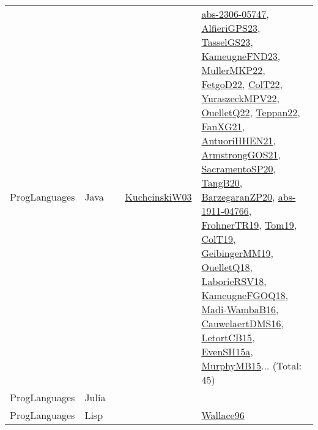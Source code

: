 {\begin{longtable}{lp{3cm}>{\raggedright}p{6cm}>{\raggedright}p{6cm}p{8cm}}
ProgLanguages & Java &  & \href{articles/KuchcinskiW03.pdf}{KuchcinskiW03}\cite{KuchcinskiW03} & \href{articles/abs-2306-05747.pdf}{abs-2306-05747}\cite{abs-2306-05747}, \href{articles/AlfieriGPS23.pdf}{AlfieriGPS23}\cite{AlfieriGPS23}, \href{papers/TasselGS23.pdf}{TasselGS23}\cite{TasselGS23}, \href{papers/KameugneFND23.pdf}{KameugneFND23}\cite{KameugneFND23}, \href{articles/MullerMKP22.pdf}{MullerMKP22}\cite{MullerMKP22}, \href{articles/FetgoD22.pdf}{FetgoD22}\cite{FetgoD22}, \href{articles/ColT22.pdf}{ColT22}\cite{ColT22}, \href{articles/YuraszeckMPV22.pdf}{YuraszeckMPV22}\cite{YuraszeckMPV22}, \href{papers/OuelletQ22.pdf}{OuelletQ22}\cite{OuelletQ22}, \href{papers/Teppan22.pdf}{Teppan22}\cite{Teppan22}, \href{articles/FanXG21.pdf}{FanXG21}\cite{FanXG21}, \href{papers/AntuoriHHEN21.pdf}{AntuoriHHEN21}\cite{AntuoriHHEN21}, \href{papers/ArmstrongGOS21.pdf}{ArmstrongGOS21}\cite{ArmstrongGOS21}, \href{articles/SacramentoSP20.pdf}{SacramentoSP20}\cite{SacramentoSP20}, \href{papers/TangB20.pdf}{TangB20}\cite{TangB20}, \href{papers/BarzegaranZP20.pdf}{BarzegaranZP20}\cite{BarzegaranZP20}, \href{articles/abs-1911-04766.pdf}{abs-1911-04766}\cite{abs-1911-04766}, \href{papers/FrohnerTR19.pdf}{FrohnerTR19}\cite{FrohnerTR19}, \href{papers/Tom19.pdf}{Tom19}\cite{Tom19}, \href{papers/ColT19.pdf}{ColT19}\cite{ColT19}, \href{papers/GeibingerMM19.pdf}{GeibingerMM19}\cite{GeibingerMM19}, \href{papers/OuelletQ18.pdf}{OuelletQ18}\cite{OuelletQ18}, \href{articles/LaborieRSV18.pdf}{LaborieRSV18}\cite{LaborieRSV18}, \href{papers/KameugneFGOQ18.pdf}{KameugneFGOQ18}\cite{KameugneFGOQ18}, \href{papers/Madi-WambaB16.pdf}{Madi-WambaB16}\cite{Madi-WambaB16}, \href{papers/CauwelaertDMS16.pdf}{CauwelaertDMS16}\cite{CauwelaertDMS16}, \href{articles/LetortCB15.pdf}{LetortCB15}\cite{LetortCB15}, \href{articles/EvenSH15a.pdf}{EvenSH15a}\cite{EvenSH15a}, \href{papers/MurphyMB15.pdf}{MurphyMB15}\cite{MurphyMB15}... (Total: 45)\\
ProgLanguages & Julia &  &  & \\
ProgLanguages & Lisp &  &  & \href{articles/Wallace96.pdf}{Wallace96}\cite{Wallace96}\\

\end{longtable}}
